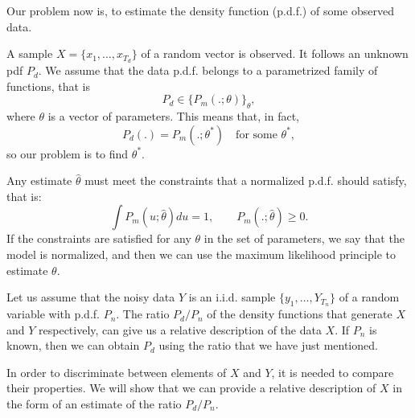 \label{Chapter:NCE}
Our problem now is, to estimate the density function (p.d.f.) of some observed data.

A sample $X = \{x_1,\dots,x_{T_d}\}$ of a random vector is observed. It follows an unknown pdf $P_d$. We assume that the data p.d.f. belongs to a parametrized family of functions, that is
\[
P_d \in \{P_m(.;\theta)\}_\theta,
\]
where $\theta$ is a vector of parameters. This means that, in fact,
$$
P_d(.) = P_m(.;\theta^*) \quad \text{for some } \theta^*,
$$
so our problem is to find $\theta^*$. 

Any estimate $\hat{\theta}$ must meet the constraints that a normalized p.d.f. should satisfy, that is:
$$
\int P_m(u;\hat{\theta})du = 1, \quad \quad P_m(.;\hat{\theta})\geq 0.
$$
If the constraints are satisfied for any $\theta$ in the set of parameters, we say that the model is normalized, and then we can use the maximum likelihood principle to estimate $\theta$.

Let us assume that the noisy data $Y$ is an i.i.d. sample $\{y_1,\dots,Y_{T_n}\}$ of a random variable with p.d.f. $P_n$. The ratio $P_d/P_n$ of the density functions that generate $X$ and $Y$ respectively, can give us a relative description of the data $X$. If $P_n$ is known, then we can obtain $P_d$ using the ratio that we have just mentioned.

In order to discriminate between elements of $X$ and $Y$, it is needed to compare their properties. We will show that we can provide a relative description of $X$ in the form of an estimate of the ratio $P_d/P_n$.

